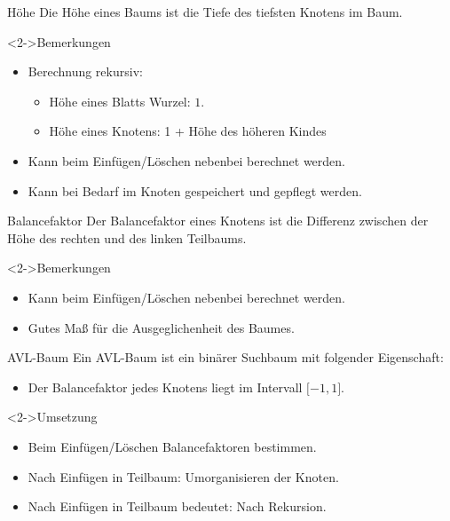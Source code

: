 \begin{frame}
    \begin{defblock}{Höhe}
        Die Höhe eines Baums ist die Tiefe des tiefsten Knotens im Baum.
    \end{defblock}
    \begin{block}<2->{Bemerkungen}
        \begin{itemize}
            \item Berechnung rekursiv:
            \begin{itemize}
                \item Höhe eines Blatts Wurzel: $1$.
                \item Höhe eines Knotens: 1 + Höhe des höheren Kindes
            \end{itemize}
            \item Kann beim Einfügen/Löschen nebenbei berechnet werden.
            \item Kann bei Bedarf im Knoten gespeichert und gepflegt werden.
        \end{itemize}
    \end{block}
\end{frame}

\begin{frame}
    \begin{defblock}{Balancefaktor}
        Der Balancefaktor eines Knotens ist die Differenz zwischen der Höhe des rechten und des linken Teilbaums.
    \end{defblock}
    \begin{block}<2->{Bemerkungen}
        \begin{itemize}
            \item Kann beim Einfügen/Löschen nebenbei berechnet werden.
            \item Gutes Maß für die Ausgeglichenheit des Baumes.
        \end{itemize}
    \end{block}
\end{frame}

\begin{frame}
    \begin{defblock}{AVL-Baum}
        Ein AVL-Baum ist ein binärer Suchbaum mit folgender Eigenschaft:
        \begin{itemize}
            \item Der Balancefaktor jedes Knotens liegt im Intervall $\lbrack -1, 1 \rbrack$.
        \end{itemize}
    \end{defblock}
    \begin{block}<2->{Umsetzung}
        \begin{itemize}
            \item Beim Einfügen/Löschen Balancefaktoren bestimmen.
            \item Nach Einfügen in Teilbaum: Umorganisieren der Knoten.
            \item<3-> Nach Einfügen in Teilbaum bedeutet: Nach Rekursion.
        \end{itemize}
    \end{block}
\end{frame}

